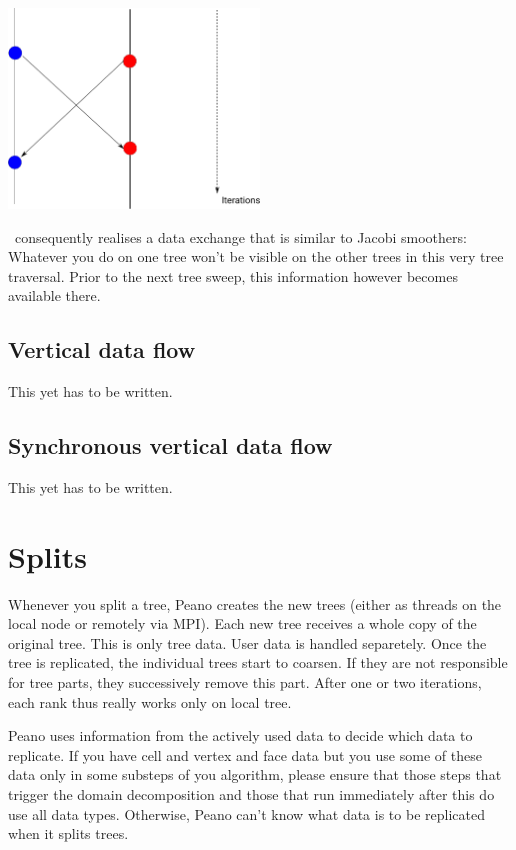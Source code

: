 \begin{center}
 \includegraphics[width=0.5\textwidth]{51_domain-decomposition/boundary-data-flow.pdf}
\end{center}

\noindent
\Peano\ consequently realises a data exchange that is similar to Jacobi
smoothers:
Whatever you do on one tree won't be visible on the other trees in this very
tree traversal.
Prior to the next tree sweep, this information however becomes available there.


\subsection{Vertical data flow}

This yet has to be written.

\subsection{Synchronous vertical data flow}

This yet has to be written.


\section{Splits}

Whenever you split a tree, Peano creates the new trees (either as threads on
the local node or remotely via MPI). 
Each new tree receives a whole copy of the original tree. 
This is only tree data. 
User data is handled separetely.
Once the tree is replicated, the individual trees start to coarsen.
If they are not responsible for tree parts, they successively remove this part. 
After one or two iterations, each rank thus really works only on local tree.


\begin{remark}
 Peano uses information from the actively used data to decide which data to
 replicate.
 If you have cell and vertex and face data but you use some of these data only
 in some substeps of you algorithm, please ensure that those steps that trigger
 the domain decomposition and those that run immediately after this do use all
 data types.
 Otherwise, Peano can't know what data is to be replicated when it splits trees.
\end{remark}


